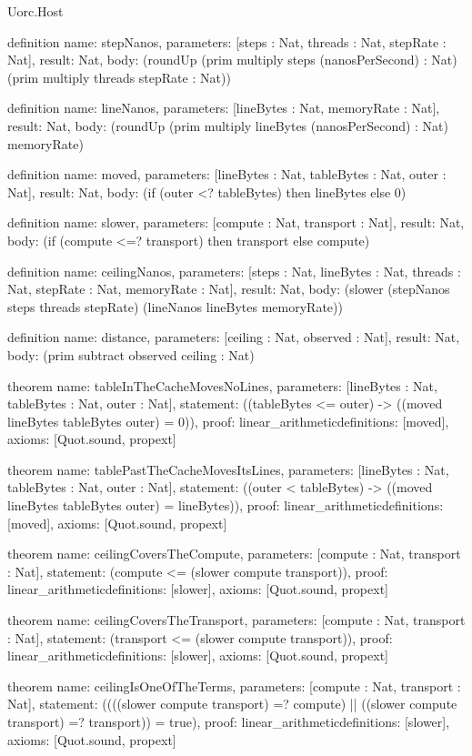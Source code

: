 \begin{lexlean}{Uorc.Host}
\begin{semanticmodule}
definition{
  name: stepNanos,
  parameters: [steps : Nat, threads : Nat, stepRate : Nat],
  result: Nat,
  body: (roundUp (prim multiply steps (nanosPerSecond) : Nat) (prim multiply threads stepRate : Nat))
}

definition{
  name: lineNanos,
  parameters: [lineBytes : Nat, memoryRate : Nat],
  result: Nat,
  body: (roundUp (prim multiply lineBytes (nanosPerSecond) : Nat) memoryRate)
}

definition{
  name: moved,
  parameters: [lineBytes : Nat, tableBytes : Nat, outer : Nat],
  result: Nat,
  body: (if (outer <? tableBytes) then lineBytes else 0)
}

definition{
  name: slower,
  parameters: [compute : Nat, transport : Nat],
  result: Nat,
  body: (if (compute <=? transport) then transport else compute)
}

definition{
  name: ceilingNanos,
  parameters: [steps : Nat, lineBytes : Nat, threads : Nat, stepRate : Nat, memoryRate : Nat],
  result: Nat,
  body: (slower (stepNanos steps threads stepRate) (lineNanos lineBytes memoryRate))
}

definition{
  name: distance,
  parameters: [ceiling : Nat, observed : Nat],
  result: Nat,
  body: (prim subtract observed ceiling : Nat)
}

theorem{
  name: tableInTheCacheMovesNoLines,
  parameters: [lineBytes : Nat, tableBytes : Nat, outer : Nat],
  statement: ((tableBytes <= outer) -> ((moved lineBytes tableBytes outer) = 0)),
  proof: linear_arithmetic{definitions: [moved]},
  axioms: [Quot.sound, propext]
}

theorem{
  name: tablePastTheCacheMovesItsLines,
  parameters: [lineBytes : Nat, tableBytes : Nat, outer : Nat],
  statement: ((outer < tableBytes) -> ((moved lineBytes tableBytes outer) = lineBytes)),
  proof: linear_arithmetic{definitions: [moved]},
  axioms: [Quot.sound, propext]
}

theorem{
  name: ceilingCoversTheCompute,
  parameters: [compute : Nat, transport : Nat],
  statement: (compute <= (slower compute transport)),
  proof: linear_arithmetic{definitions: [slower]},
  axioms: [Quot.sound, propext]
}

theorem{
  name: ceilingCoversTheTransport,
  parameters: [compute : Nat, transport : Nat],
  statement: (transport <= (slower compute transport)),
  proof: linear_arithmetic{definitions: [slower]},
  axioms: [Quot.sound, propext]
}

theorem{
  name: ceilingIsOneOfTheTerms,
  parameters: [compute : Nat, transport : Nat],
  statement: ((((slower compute transport) =? compute) || ((slower compute transport) =? transport)) = true),
  proof: linear_arithmetic{definitions: [slower]},
  axioms: [Quot.sound, propext]
}


\end{semanticmodule}
\end{lexlean}
